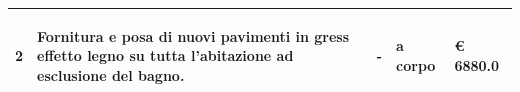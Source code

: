 \documentclass[a4paper]{article}
\begin{document}
\begin{tabular}{ | L{10mm} |  L{86mm} | L{12mm} | L{12mm} | L{16mm} | }
                                 
                                   \vspace{2.5mm}
                                   \begin{spacing}{0}
                                2
                                   \end{spacing} &
                                   \vspace{2.5mm}
                                   \begin{spacing}{0}
                                Fornitura e posa di nuovi pavimenti in gress effetto legno su tutta l'abitazione ad esclusione del bagno.
                                   \end{spacing} &
                                   \vspace{2.5mm}
                                   \begin{spacing}{0}
                                -
                                   \end{spacing} &
                                   \vspace{2.5mm}
                                   \begin{spacing}{0}
                                a corpo
                                   \end{spacing} &
                                   \vspace{2.5mm}
                                   \begin{spacing}{0}
                                     \euro\hfill 
                                 6880.0
                                   \end{spacing} \\
                                   \hline


\end{tabular}
\end{document}
